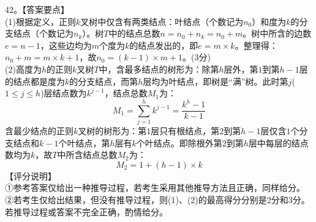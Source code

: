 42。【答案要点】 \\
(1)根据定义，正则$k$叉树中仅含有两类结点：叶结点（个数记为$n_0$）和度为$k$的分支结点（个数记为$n_k$）。树$T$中的结点总数$n=n_0+n_k=n_0+m$。树中所含的边数$e=n-1$，这些边均为$m$个度为$k$的结点发出的，即$e=m\times k$。整理得：$n_0+m=m\times k+1$，故$n_0=(k-1)\times m+1$。(3分) \\
(2)高度为$h$的正则$k$叉树$T$中，含最多结点的树形为：除第$h$层外，第$1$到第$h-1$层的结点都是度为$k$的分支结点，而第$h$层均为叶结点，即树是“满”树。此时第$j$($1\leqslant j\leqslant h$)层结点数为$k^{j-1}$，结点总数$M_1$为：
\begin{equation}
M_1=\sum_{j=1}^{h}k^{j-1}=\frac{k^h-1}{k-1}
\end{equation}
含最少结点的正则$k$叉树的树形为：第$1$层只有根结点，第$2$到第$h-1$层仅含$1$个分支结点和$k-1$个叶结点，第$h$层有$k$个叶结点。即除根外第$2$到第$h$层中每层的结点数均为$k$，故$T$中所含结点总数$M_2$为： \\
\begin{equation}
M_2=1+(h-1)\times k
\end{equation}
【评分说明】 \\
①参考答案仅给出一种推导过程，若考生采用其他推导方法且正确，同样给分。 \\
②若考生仅给出结果，但没有推导过程，则(1)、(2)的最高得分分别是2分和3分。若推导过程或答案不完全正确，酌情给分。

